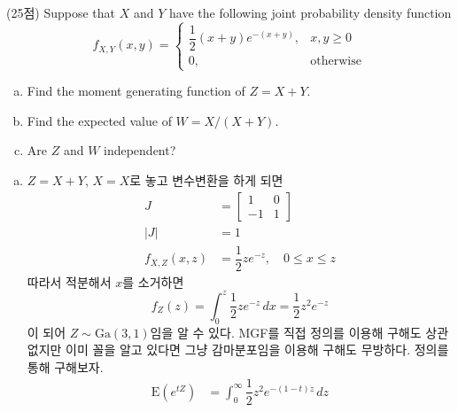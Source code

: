 \documentclass[answers]{exam}
\begin{document}
\newpage
{}
\begin{questions}
   \question
    (25점) Suppose that $X$ and $Y$ have the following joint probability density function
    \begin{equation}
      f_{X,Y}\left(x,y\right) = \begin{cases}\dfrac{1}{2}\left(x+y\right)e^{-\left(x+y\right)},& x,y\geq 0\\0, & \text{otherwise}  \end{cases}
    \end{equation}
    \begin{enumerate}[(a)]
      \item Find the moment generating function of $Z=X+Y$.
      \item Find the expected value of $W=X/\left(X+Y\right)$.
      \item Are $Z$ and $W$ independent?
    \end{enumerate}
    \begin{solution}
      \begin{enumerate}[(a)]
        \item $Z=X+Y$, $X=X$로 놓고 변수변환을 하게 되면
        \begin{align}
          J&=\begin{bmatrix}1 & 0 \\ -1 & 1\end{bmatrix}\\
          \left|J\right| &= 1\\
          f_{X,Z}\left(x,z\right) &= \dfrac{1}{2}ze^{-z},\quad 0\leq x \leq z
        \end{align}
        따라서 적분해서 $x$를 소거하면
        \begin{equation}
          f_{Z}\left(z\right) = \int_{0}^{z}\dfrac{1}{2}ze^{-z}\,dx = \dfrac{1}{2}z^{2}e^{-z}
        \end{equation}
        이 되어 $Z\sim\mathrm{Ga}\left(3,1\right)$임을 알 수 있다. MGF를 직접 정의를 이용해 구해도 상관없지만 이미 꼴을 알고 있다면 그냥 감마분포임을 이용해 구해도 무방하다. 정의를 통해 구해보자.
        \begin{align}
          \mathrm{E}\left(e^{tZ}\right) &= \int_{0}^{\infty}\dfrac{1}{2}z^{2}e^{-\left(1-t\right)z}\,dz\\

\end{align}
\end{enumerate}
\end{solution}
\end{questions}
\end{document}
